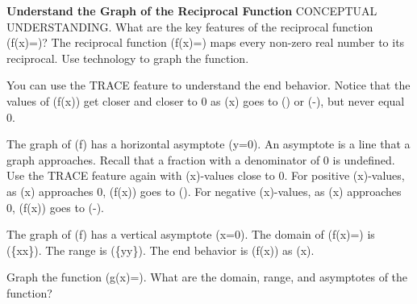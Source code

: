 \documentclass{article}
\newenvironment{example}[1]{}{}         %
\newenvironment{tryit}[1]{}{}           %
\newcommand{\answer}[1]{}               %
\newcommand{\placeholder}[2]{}          %
\newcommand{\te}[1]{}                   %
\begin{document}
\begin{example}{4}
\textbf{Understand the Graph of the Reciprocal Function}
CONCEPTUAL UNDERSTANDING. What are the key features of the reciprocal function (f(x)=)?
The reciprocal function (f(x)=) maps every non-zero real number to its reciprocal. Use technology to graph the function.
\placeholder{graph}{Red y=1/x, branches in quadrants I and III, arrows toward axes at all four ends; x,y axes with O, labels -5,5, unit grid, window -6 to6 both directions. No intercepts; axes are asymptotes.}
\te{As x approaches plus or minus infinity, the graph approaches the x-axis. As x approaches 0, the graph approaches the y-axis.}
You can use the TRACE feature to understand the end behavior. Notice that the values of (f(x)) get closer and closer to 0 as (x) goes to (\infty) or (-\infty), but never equal 0.
\placeholder{graph}{Red y=1/x in wide window: x from -15000 to15000 with grid1250 and labels -10000,-5000,5000,10000; y from -0.00125 to0.00125 grid0.00025 labels -0.001,0.001. x,y,O axes, arrows at ends. Six solid labeled red points (1000,1/1000),(5000,1/5000),(10000,1/10000),(-1000,-1/1000),(-5000,-1/5000),(-10000,-1/10000).}
The graph of (f) has a horizontal asymptote (y=0). An asymptote is a line that a graph approaches.
Recall that a fraction with a denominator of 0 is undefined. Use the TRACE feature again with (x)-values close to 0. For positive (x)-values, as (x) approaches 0, (f(x)) goes to (\infty). For negative (x)-values, as (x) approaches 0, (f(x)) goes to (-\infty).
\placeholder{graph}{Red y=1/x tall window: x -0.007 to0.005, grid0.001, labels -0.005,0.005; y -14000 to14000, grid1250 approximately, labels -10000,-5000,5000,10000. x,y,O axes; red branches I and III with arrows. Labeled solid points (1/10000,10000),(1/5000,5000),(1/1000,1000),(-1/1000,-1000),(-1/5000,-5000),(-1/10000,-10000).}
The graph of (f) has a vertical asymptote (x=0).
The domain of (f(x)=) is (\{x\mid x\}). The range is (\{y\mid y\}).
The end behavior is (f(x)) as (x\to\pm\infty).
\answer{Horizontal asymptote (y=0); vertical asymptote (x=0); domain (\{x\mid x\neq0\}); range (\{y\mid y\neq0\}); (f(x)\to0) as (x\to\pm\infty).}
\end{example}
\begin{tryit}{4}
Graph the function (g(x)=). What are the domain, range, and asymptotes of the function?
\placeholder{graph}{Answer: red y=10/x, branches I and III, four end arrows, asymptotes x=0,y=0. Axes x,y,O; window -12 to12 both, grid2, labels x -4,4,8 and y -4,4,8. Solid labeled points (1,10),(10,1),(-10,-1),(-1,-10).}
\answer{domain: all real numbers, (x\neq0); range: all real numbers, (y\neq0). A horizontal asymptote of the graph is (y=0). A vertical asymptote of the graph is (x=0).}
\end{tryit}
\end{document}
